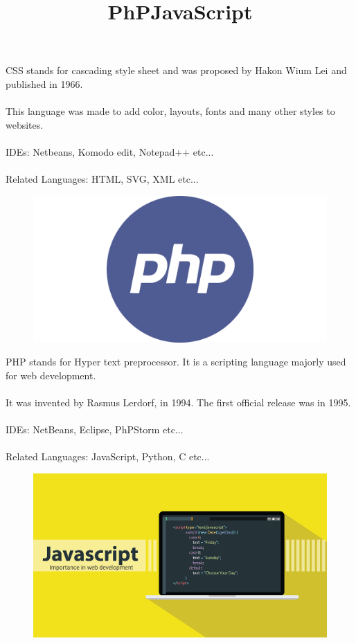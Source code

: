 \documentclass{article}
\begin{document}
	\newpage
	CSS stands for cascading style sheet and was proposed by Hakon Wium Lei and published in 1966.
	\paragraph{}
	This language was made to add color, layouts, fonts and many other styles to websites.
	\paragraph{}
	IDEs: Netbeans, Komodo edit, Notepad++ etc...
	\paragraph{}
	Related Languages: HTML, SVG, XML etc... 
	
	\newpage
	\title{PhP}
	\begin{figure}	
		\includegraphics[width=\linewidth]{php.png}
	\end{figure}

	\newpage
	PHP stands for Hyper text preprocessor. It is a scripting language majorly used for web development.
	\paragraph{}
	It was invented by Rasmus Lerdorf, in 1994. The first official release was in 1995.
	\paragraph{}
	IDEs: NetBeans, Eclipse, PhPStorm etc...
	\paragraph{}
	Related Languages: JavaScript, Python, C etc...
	
	\newpage
	\title{JavaScript}
	\begin{figure}	
		\includegraphics[width=\linewidth]{javascript.jpg}
	\end{figure}
	
	\newpage
\end{document}
